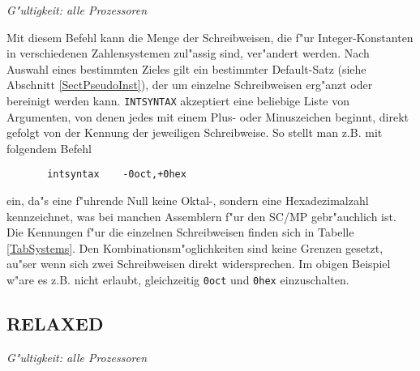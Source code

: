 \documentclass[12pt,a4paper,twoside]{report}
\makeatletter
\newcommand{\tty}[1]{{\tt #1}}
\newcommand{\ttindex}[1]{\index{#1@{\tt #1}}}
\makeatother
\begin{document}
{\em G"ultigkeit: alle Prozessoren}

Mit diesem Befehl kann die Menge der Schreibweisen, die f"ur Integer-Konstanten
in verschiedenen Zahlensystemen zul"assig sind, ver"andert werden.  Nach Auswahl
eines bestimmten Zieles gilt ein bestimmter Default-Satz (siehe Abschnitt
\ref{SectPseudoInst}), der um einzelne Schreibweisen erg"anzt oder bereinigt werden
kann. \tty{INTSYNTAX} akzeptiert eine beliebige Liste von Argumenten, von denen
jedes mit einem Plus- oder Minuszeichen beginnt, direkt gefolgt von der Kennung
der jeweiligen Schreibweise.  So stellt man z.B. mit folgendem Befehl
\begin{verbatim}
       intsyntax    -0oct,+0hex
\end{verbatim}
ein, da"s eine f"uhrende Null keine Oktal-, sondern eine Hexadezimalzahl
kennzeichnet, was bei manchen Assemblern f"ur den SC/MP gebr"auchlich ist.  Die
Kennungen f"ur die einzelnen Schreibweisen finden sich in Tabelle \ref{TabSystems}.
Den Kombinationsm"oglichkeiten sind keine Grenzen gesetzt, au"ser wenn sich zwei
Schreibweisen direkt widersprechen.  Im obigen Beispiel w"are es z.B. nicht
erlaubt, gleichzeitig \tty{0oct} und \tty{0hex} einzuschalten.


\subsection{RELAXED}
\label{SectRELAXED}
\ttindex{RELAXED}

{\em G"ultigkeit: alle Prozessoren}
\end{document}
